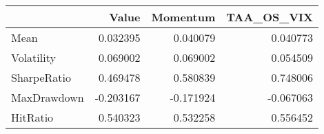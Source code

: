 \begin{tabular}{lrrr}
\toprule
{} &     Value &  Momentum &  TAA\_OS\_VIX \\
\midrule
Mean        &  0.032395 &  0.040079 &    0.040773 \\
Volatility  &  0.069002 &  0.069002 &    0.054509 \\
SharpeRatio &  0.469478 &  0.580839 &    0.748006 \\
MaxDrawdown & -0.203167 & -0.171924 &   -0.067063 \\
HitRatio    &  0.540323 &  0.532258 &    0.556452 \\
\bottomrule
\end{tabular}
